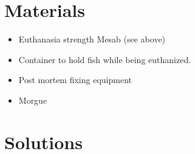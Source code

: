 \documentclass[
  letterpaper,
  DIV=11,
  numbers=noendperiod]{scrreprt}
\providecommand{\tightlist}{%
  \setlength{\itemsep}{0pt}\setlength{\parskip}{0pt}}\usepackage{longtable,booktabs,array}
\begin{document}
\hypertarget{materials-34}{%
\section{Materials}\label{materials-34}}

\begin{itemize}
\tightlist
\item
  Euthanasia strength Mesab (see above)
\item
  Container to hold fish while being euthanized.
\item
  Post mortem fixing equipment
\item
  Morgue
\end{itemize}

\hypertarget{solutions-29}{%
\section{Solutions}\label{solutions-29}}
\end{document}
